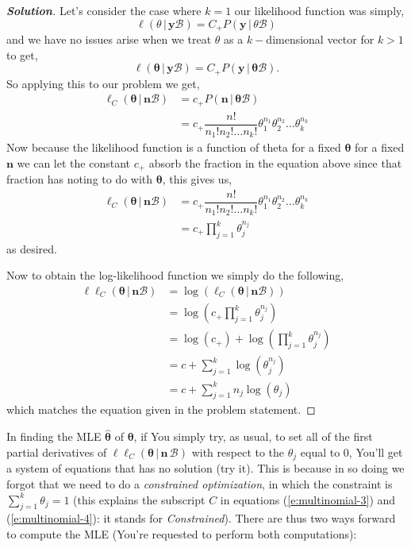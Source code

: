 \documentclass[12pt]{article}
\newcommand{\given}{\, | \,}
\newenvironment{solution}{\begin{tcolorbox}[breakable]\begin{proof}[\textbf{\textit{Solution}}] }{\end{proof}\end{tcolorbox}}
\newcommand{\bb}{\mathcal{B}}
\newcommand{\btheta}{\bm{\theta}}
\newcommand{\by}{\bm{y}}
\begin{document}
\begin{itemize}
\begin{itemize}
\begin{itemize}
\begin{solution}
     Let's consider the case where $k=1$ our likelihood function was simply,
     \[\ell(\theta \given \bm{y} \mathcal{B}) = C_+ P(\bm{y} \given \theta \mathcal{B})\]
     and we have no issues arise when we treat $\theta$ as a $k-$dimensional vector for $k > 1$ to get,
     \[\ell(\bm{\theta} \given \by \bb) = C_+ P(\by \given \btheta \bb).\]
     So applying this to our problem we get,
     \begin{align*}
         \ell_C(\btheta \given \bm{n}\mathcal{B}) &= c_+P(\bm{n}\given \btheta \bb) \\
         &= c_+\dfrac{n!}{n_1!n_2! \dots n_k!}\theta_1^{n_1}\theta_2^{n_2}\dots \theta_k^{n_k}
     \end{align*}
     Now because the likelihood function is a function of theta for a fixed $\btheta$ for a fixed $\bm{n}$ we can let the constant $c_+$ absorb the fraction in the equation above since that fraction has noting to do with $\btheta$, this gives us,
     \begin{align*}
        \ell_C(\btheta \given \bm{n}\mathcal{B}) &= c_+\dfrac{n!}{n_1!n_2! \dots n_k!}\theta_1^{n_1}\theta_2^{n_2}\dots \theta_k^{n_k} \\
        &= c_+ \prod_{j = 1}^{k}\theta_j^{n_j}    
     \end{align*}
     as desired.

     Now to obtain the log-likelihood function we simply do the following,
     \begin{align*}
         \ell\ell_C(\btheta \given \bm{n}\bb) &= \log(\ell_C(\btheta \given \bm{n}\mathcal{B})) \\
         &= \log(c_+ \prod_{j = 1}^{k}\theta_j^{n_j}) \\
         &= \log(c_+) + \log(\prod_{j = 1}^{k}\theta_j^{n_j}) \\
         &= c + \sum_{j = 1}^{k}\log(\theta_j^{n_j}) \\
         &= c + \sum_{j = 1}^{k}n_j \log(\theta_j)
     \end{align*}
     which matches the equation given in the problem statement. 
\end{solution}
\end{itemize}

In finding the MLE $\hat{ \bm{ \theta } }$ of $\bm{ \theta }$, if You simply try, as usual, to set all of the first partial derivatives of $\ell \ell_C ( \bm{ \theta } \given \bm{ n } \, \mathcal{ B } )$ with respect to the $\theta_j$ equal to 0, You'll get a system of equations that has no solution (try it). This is because in so doing we forgot that we need to do a \textit{constrained optimization}, in which the constraint is $\sum_{ j = 1 }^k \theta_j = 1$ (this explains the subscript $C$ in equations (\ref{e:multinomial-3}) and (\ref{e:multinomial-4}): it stands for \textit{Constrained}). There are thus two ways forward to compute the MLE (You're requested to perform both computations):


\end{itemize}
\end{itemize}
\end{document}
